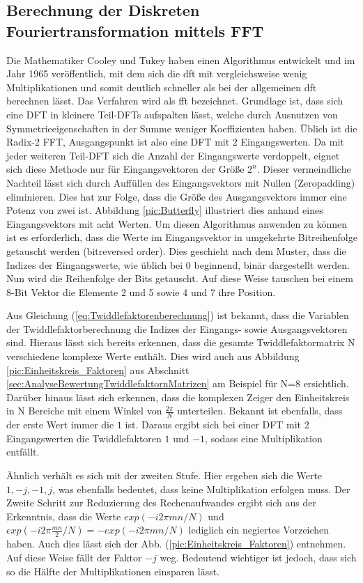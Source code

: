 \subsection{Berechnung der Diskreten Fouriertransformation mittels FFT}\label{sec:BerechnungFFT}
Die Mathematiker Cooley und Tukey haben einen Algorithmus entwickelt und im Jahr 1965 veröffentlich, mit dem sich die \gls{dft} mit vergleichsweise wenig Multiplikationen
und somit deutlich schneller als bei der allgemeinen \gls{dft} berechnen lässt. Das Verfahren wird als \gls{fft} bezeichnet.
Grundlage ist, dass sich eine DFT
in kleinere Teil-DFTs aufspalten lässt, welche durch Ausnutzen von Symmetrieeigenschaften in der Summe weniger Koeffizienten haben. 
Üblich ist die Radix-2 FFT, Ausgangspunkt ist also eine DFT mit 2 Eingangswerten.
Da mit jeder weiteren Teil-DFT sich die Anzahl der Eingangswerte verdoppelt, eignet sich diese Methode nur für Eingangsvektoren der Größe $2^n$. Dieser
vermeindliche Nachteil lässt sich durch Auffüllen des Eingangsvektors mit Nullen (Zeropadding) eliminieren. Dies hat zur Folge, dass die Größe des Ausgangsvektors
immer eine Potenz von zwei ist. Abbildung \ref{pic:Butterfly} illustriert dies anhand eines Eingangsvektors mit acht Werten. 
Um diesen Algorithmus anwenden zu können ist es erforderlich, dass die Werte im Eingangsvektor in umgekehrte Bitreihenfolge getauscht werden (bitreversed order).
Dies geschieht nach dem Muster, dass die Indizes der Eingangswerte, wie
üblich bei 0 beginnend, binär dargestellt werden. Nun wird die Reihenfolge der Bits getauscht. Auf diese Weise tauschen bei einem 8-Bit Vektor die
Elemente 2 und 5 sowie 4 und 7 ihre Position.

Aus Gleichung (\ref{eq:Twiddlefaktorenberechnung}) ist 
bekannt, dass die Variablen der Twiddlefaktorberechnung die Indizes der Eingangs- sowie Ausgangsvektoren sind. Hieraus lässt sich bereits erkennen, dass
die gesamte Twiddlefaktormatrix N verschiedene komplexe Werte enthält. Dies wird auch aus Abbildung \ref{pic:Einheitskreis_Faktoren} aus Abschnitt 
\ref{sec:AnalyseBewertungTwiddlefaktornMatrizen} am Beispiel für N=8 ersichtlich. Darüber hinaus lässt sich erkennen, dass die komplexen Zeiger den Einheitskreis 
in N Bereiche mit einem Winkel von $\frac{2 \pi}{N}$ unterteilen. Bekannt ist ebenfalls, dass der erste Wert immer die $1$ ist.
Daraus ergibt sich bei einer DFT mit 2 Eingangswerten die Twiddlefaktoren $1$ und $-1$, sodass eine Multiplikation entfällt. 

Ähnlich verhält es sich mit der zweiten Stufe.
Hier ergeben sich die Werte $1, -j, -1, j$, was ebenfalls bedeutet, dass keine Multiplikation erfolgen muss. Der Zweite Schritt zur Reduzierung des Rechenaufwandes ergibt sich
aus der Erkenntnis, dass die Werte $exp(-i 2 \pi m n/N)$ und $exp(-i 2 \pi \frac{m n}{2}/N) = -exp(-i 2 \pi m n/N)$ lediglich ein negiertes Vorzeichen haben. Auch dies lässt sich der Abb. 
(\ref{pic:Einheitskreis_Faktoren}) entnehmen. Auf diese Weise fällt der Faktor $-j$ weg. Bedeutend wichtiger ist jedoch, dass sich so die Hälfte der Multiplikationen einsparen lässt.

